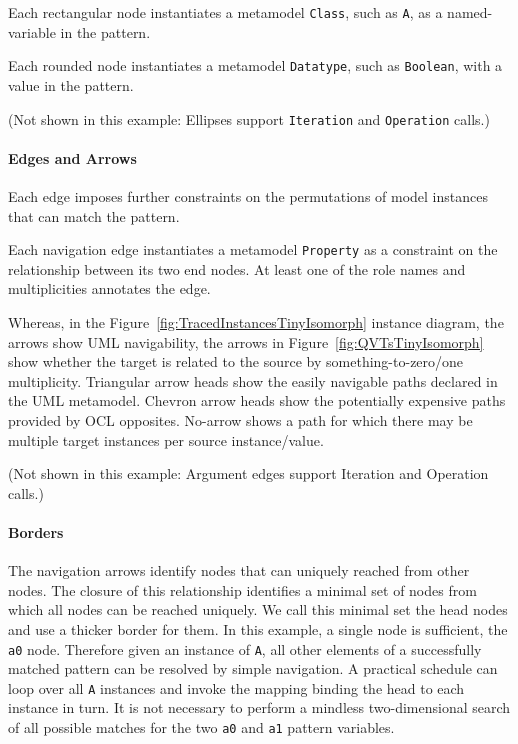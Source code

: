 \documentclass{jot}
\begin{document}
Each rectangular node instantiates a metamodel \verb|Class|, such as \verb|A|, as a named-variable in the pattern.

Each rounded node instantiates a metamodel \verb|Datatype|, such as \verb|Boolean|, with a value in the pattern.

(Not shown in this example: Ellipses support \verb|Iteration| and \verb|Operation| calls.)

\paragraph{Edges and Arrows}

Each edge imposes further constraints on the permutations of model instances that can match the pattern. 

Each navigation edge instantiates a metamodel \verb|Property| as a constraint on the relationship between its two end nodes. At least one of the role names and multiplicities annotates the edge.

Whereas, in the Figure~\ref{fig:TracedInstancesTinyIsomorph} instance diagram, the arrows show UML navigability, the arrows in Figure~\ref{fig:QVTsTinyIsomorph} show whether the target is related to the source by something-to-zero/one multiplicity. Triangular arrow heads show the easily navigable paths declared in the UML metamodel. Chevron arrow heads show the potentially expensive paths provided by OCL opposites. No-arrow shows a path for which there may be multiple target instances per source instance/value.

(Not shown in this example: Argument edges support Iteration and Operation calls.)

\paragraph{Borders}

The navigation arrows identify nodes that can uniquely reached from other nodes. The closure of this relationship identifies a minimal set of nodes from which all nodes can be reached uniquely. We call this minimal set the head nodes and use a thicker border for them. In this example, a single node is sufficient, the \verb|a0| node. Therefore given an instance of \verb|A|, all other elements of a successfully matched pattern can be resolved by simple navigation. A practical schedule can loop over all \verb|A| instances and invoke the mapping binding the head to each instance in turn. It is not necessary to perform a mindless two-dimensional search of all possible matches for the two \verb|a0| and \verb|a1| pattern variables.
\end{document}

